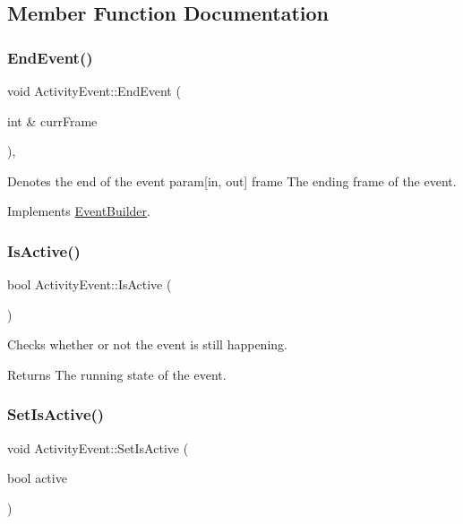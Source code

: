 \subsection{Member Function Documentation}
\mbox{\label{class_activity_event_a803c52c6e131e3da665a67424b6acd2d}} 
\subsubsection{\texorpdfstring{EndEvent()}{EndEvent()}}
{\footnotesize\ttfamily void Activity\+Event\+::\+End\+Event (\begin{DoxyParamCaption}\item[{int \&}]{curr\+Frame }\end{DoxyParamCaption})\hspace{0.3cm}{\ttfamily [override]}, {\ttfamily [virtual]}}

Denotes the end of the event param\mbox{[}in, out\mbox{]} frame The ending frame of the event. 

Implements \mbox{\hyperlink{class_event_builder_ac55f925287ac8aed2d5303706444251e}{Event\+Builder}}.

\mbox{\label{class_activity_event_a54595bd5d8bc09d8b41a0942d5543891}} 
\subsubsection{\texorpdfstring{IsActive()}{IsActive()}}
{\footnotesize\ttfamily bool Activity\+Event\+::\+Is\+Active (\begin{DoxyParamCaption}{ }\end{DoxyParamCaption})}

Checks whether or not the event is still happening. \begin{DoxyReturn}{Returns}
The running state of the event. 
\end{DoxyReturn}
\mbox{\label{class_activity_event_a631e0a9a4e1b5f607f5990c749907fa1}} 
\subsubsection{\texorpdfstring{SetIsActive()}{SetIsActive()}}
{\footnotesize\ttfamily void Activity\+Event\+::\+Set\+Is\+Active (\begin{DoxyParamCaption}\item[{bool}]{active }\end{DoxyParamCaption})}

